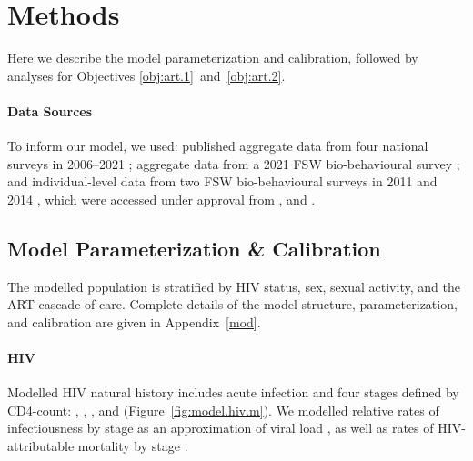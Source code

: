 \section{Methods}\label{art.meth}
Here we describe the model parameterization and calibration,
followed by analyses for Objectives \ref{obj:art.1}~and~\ref{obj:art.2}.
\paragraph{Data Sources}
To inform our model, we used:
published aggregate data from four national surveys
in 2006--2021 \cite{SDHS2006,SHIMS1,SHIMS2,SHIMS3};
aggregate data from a 2021 FSW bio-behavioural survey \cite{EswIBBS2022}; and
individual-level data from two FSW bio-behavioural surveys
in 2011 \cite{Baral2014} and 2014 \cite{EswKP2014},
which were accessed under approval from
, and
.
\subsection{Model Parameterization \& Calibration}\label{art.meth.par}
The modelled population is stratified by
HIV status, sex, sexual activity, and the ART cascade of care.
Complete details of the model structure, parameterization, and calibration
are given in Appendix~\ref{mod}.
\mf{} %
\paragraph{HIV}
Modelled HIV natural history
includes acute infection and four stages defined by CD4-count:
, , , and 
(Figure~\ref{fig:model.hiv.m}).
We modelled relative rates of infectiousness by stage
as an approximation of viral load \cite{Boily2009,Donnell2010,Bellan2015ahi},
as well as rates of HIV-attributable mortality by stage \cite{Mangal2017}.
